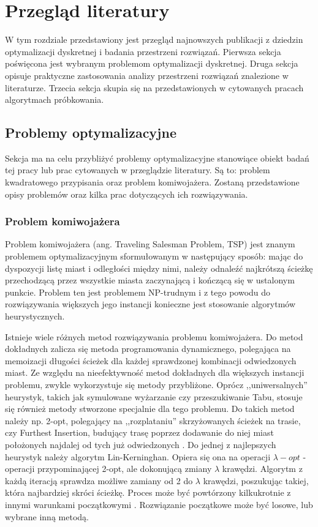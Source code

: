 \chapter{Przegląd literatury}

W tym rozdziale przedstawiony jest przegląd najnowszych publikacji z dziedzin optymalizacji dyskretnej i badania przestrzeni rozwiązań.
Pierwsza sekcja poświęcona jest wybranym problemom optymalizacji dyskretnej.
Druga sekcja opisuje praktyczne zastosowania analizy przestrzeni rozwiązań znalezione w literaturze.
Trzecia sekcja skupia się na przedstawionych w cytowanych pracach algorytmach próbkowania.

\section{Problemy optymalizacyjne}
Sekcja ma na celu przybliżyć problemy optymalizacyjne stanowiące obiekt badań tej pracy lub prac cytowanych w przeglądzie literatury.
Są to: problem kwadratowego przypisania oraz problem komiwojażera. Zostaną przedstawione opisy problemów oraz kilka prac
dotyczących ich rozwiązywania.

\subsection{Problem komiwojażera}
Problem komiwojażera (ang. Traveling Salesman Problem, TSP) jest znanym problemem optymalizacyjnym
sformułowanym w następujący sposób: mając do dyspozycji listę miast i odległości między nimi, należy odnaleźć
najkrótszą ścieżkę przechodzącą przez wszystkie miasta zaczynającą i kończącą się w ustalonym punkcie.
Problem ten jest problemem NP-trudnym i z tego powodu do rozwiązywania większych jego instancji konieczne
jest stosowanie algorytmów heurystycznych.

Istnieje wiele różnych metod rozwiązywania problemu komiwojażera. Do metod dokładnych zalicza się metoda programowania dynamicznego,
polegająca na memoizacji długości ścieżek dla każdej sprawdzonej kombinacji odwiedzonych miast.
Ze względu na nieefektywność metod dokładnych dla większych instancji problemu, zwykle wykorzystuje się metody przybliżone.
Oprócz ,,uniwersalnych'' heurystyk, takich jak symulowane wyżarzanie czy przeszukiwanie Tabu, stosuje się również metody stworzone
specjalnie dla tego problemu. Do takich metod należy np. 2-opt, polegający na ,,rozplataniu'' skrzyżowanych ścieżek na trasie, czy Furthest Insertion,
budujący trasę poprzez dodawanie do niej miast położonych najdalej od tych już odwiedzonych \cite{JUNGER1995225}.
Do jednej z najlepszych heurystyk należy algorytm Lin-Kerninghan.
Opiera się ona na operacji $\lambda-opt$ - operacji przypominającej 2-opt, ale dokonującą zmiany $\lambda$ krawędzi.
Algorytm z każdą iteracją sprawdza możliwe zamiany od 2 do $\lambda$ krawędzi, poszukując takiej, która najbardziej skróci ścieżkę.
Proces może być powtórzony kilkukrotnie z innymi warunkami początkowymi \cite{DBLP:journals/eor/Helsgaun00}. Rozwiązanie początkowe może być losowe, lub wybrane inną metodą.

